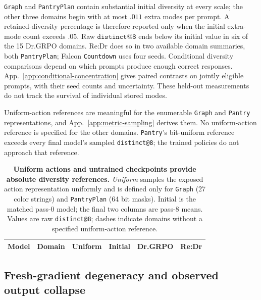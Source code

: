 \documentclass{article}
\makeatletter
\newcommand{\1}{\mathbf 1}
\newcommand{\distk}{\texttt{distinct@8}}
\theoremstyle{remark}
\theoremstyle{definition}
\theoremstyle{plain}
\makeatother
\begin{document}
\texttt{Graph} and \texttt{PantryPlan} contain substantial initial diversity at every scale;
the other three domains begin with at most $.011$ extra modes per prompt.
A retained-diversity percentage is therefore reported only when the initial
extra-mode count exceeds $.05$. Raw $\texttt{distinct@8}$ ends below its
initial value in six of the 15 Dr.GRPO domains. Re:Dr does so in
two available domain summaries, both \texttt{PantryPlan}; Falcon \texttt{Countdown} uses
four seeds. Conditional diversity comparisons depend on which prompts produce
enough correct responses. App.~\ref{app:conditional-concentration} gives
paired contrasts on jointly eligible prompts, with their seed counts and
uncertainty. These held-out measurements do not track the survival of
individual stored modes.

Uniform-action references are meaningful for the enumerable \texttt{Graph} and
\texttt{Pantry} representations, and App.~\ref{app:metric-sampling} derives them. No uniform-action
reference is specified for the other domains. \texttt{Pantry}'s bit-uniform reference exceeds every final model's sampled
\texttt{distinct@8}; the trained policies do not approach that reference.

\begin{table}[t]
  \centering
  \caption{\textbf{Uniform actions and untrained checkpoints provide absolute diversity references.}
  \emph{Uniform} samples the exposed action representation uniformly and is
  defined only for \texttt{Graph} (27 color strings) and \texttt{PantryPlan} (64 bit masks).
  Initial is the matched pass-0 model; the final two columns are pass-8 means.
  Values are raw \distk{}; dashes indicate domains without a specified
  uniform-action reference.}
  \label{tab:absolute-support-references}
  \scriptsize
  \setlength{\tabcolsep}{4.2pt}
  \begin{tabular}{@{}llrrrr@{}}
    \toprule
    \textbf{Model} & \textbf{Domain} & \textbf{Uniform} & \textbf{Initial}
      & \textbf{Dr.GRPO} & \textbf{Re:Dr} \\
    \midrule
    
  \end{tabular}
\end{table}


\subsection{Fresh-gradient degeneracy and observed output collapse}
\label{app:degenerate-groups}
\end{document}

